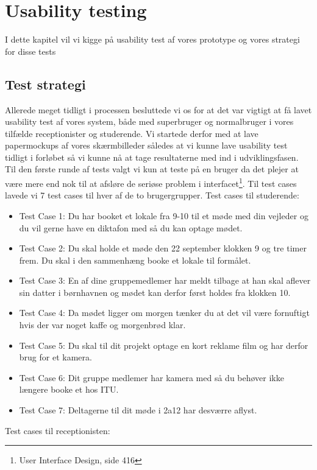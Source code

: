 \chapter{Usability testing}
I dette kapitel vil vi kigge på usability test af vores prototype og vores strategi for disse tests
\section{Test strategi}
Allerede meget tidligt i processen besluttede vi os for at det var vigtigt at få lavet usability test af vores system, både med superbruger og normalbruger i vores tilfælde receptionister og studerende. Vi startede derfor med at lave papermockups af vores skærmbilleder således at vi kunne lave usability test tidligt i forløbet så vi kunne nå at tage resultaterne med ind i udviklingsfasen. Til den første runde af tests valgt vi kun at teste på en bruger da det plejer at være mere end nok til at afsløre de seriøse problem i interfacet\footnote{User Interface Design, side 416}. Til test cases lavede vi 7 test cases til hver af de to brugergrupper.
Test cases til studerende:
\begin{itemize}
\item Test Case 1: Du har booket et lokale fra 9-10 til et møde med din vejleder og du vil gerne have en diktafon med så du kan optage mødet.
\item Test Case 2: Du skal holde et møde den 22 september klokken 9 og tre timer frem. Du skal i den sammenhæng booke et lokale til formålet.
\item Test Case 3: En af dine gruppemedlemer har meldt tilbage at han skal aflever sin datter i børnhavnen og mødet kan derfor først holdes fra klokken 10.
\item Test Case 4: Da mødet ligger om morgen tænker du at det vil være fornuftigt hvis der var noget kaffe og morgenbrød klar.
\item Test Case 5: Du skal til dit projekt optage en kort reklame film og har derfor brug for et kamera.
\item Test Case 6: Dit gruppe medlemer har kamera med så du behøver ikke længere booke et hos ITU.
\item Test Case 7: Deltagerne til dit møde i 2a12 har desværre aflyst.
\end{itemize}
Test cases til receptionisten:
